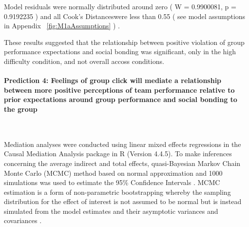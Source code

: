 \documentclass[english]{article}\usepackage[]{graphicx}\usepackage[]{color}
\makeatletter
\newenvironment{kframe}{%
 \def\at@end@of@kframe{}%
 \ifinner\ifhmode%
  \def\at@end@of@kframe{\end{minipage}}%
  \begin{minipage}{\columnwidth}%
 \fi\fi%
 \def\FrameCommand##1{\hskip\@totalleftmargin \hskip-\fboxsep
 \colorbox{shadecolor}{##1}\hskip-\fboxsep
     \hskip-\linewidth \hskip-\@totalleftmargin \hskip\columnwidth}%
 \MakeFramed {\advance\hsize-\width
   \@totalleftmargin\z@ \linewidth\hsize
   \@setminipage}}%
 {\par\unskip\endMakeFramed%
 \at@end@of@kframe}
\newenvironment{knitrout}{}{} %
\newcommand{\myparagraph}[1]{\paragraph{#1}\mbox{}\\}
\newcommand{\pvalue}{p =}
\newcommand{\resdist}{W = }
\newcommand{\cooksD}{Cook's Distances}
\makeatother
\begin{document}
Model residuals were normally distributed around zero
(
  \resdist
    0.9900081,
  \pvalue
    0.9192235
)
and all \cooksD were less than
  0.55
(
see model assumptions in Appendix  ~\ref{fig:M1aAssumptions}
)
.

These results suggested that the relationship between positive violation of group performance expectations and social bonding was significant, only in the high difficulty condition, and not overall accoss conditions.


\myparagraph{Prediction 4: Feelings of group click will mediate a relationship between more positive perceptions of team performance relative to prior expectations around group performance and social bonding to the group}

\begin{knitrout}
\color{fgcolor}\begin{kframe}


{\ttfamily\noindent\bfseries{}}

{\ttfamily\noindent\bfseries\color{errorcolor}{\#\# Error in summary(med.out.groupPerfExp): object 'med.out.groupPerfExp' not found}}

{\ttfamily\noindent\bfseries\color{errorcolor}{\#\# Error in summary(med.out.groupPerfExp): object 'med.out.groupPerfExp' not found}}

{\ttfamily\noindent\bfseries\color{errorcolor}{\#\# Error in summary(med.out.groupPerfExp.unclass): object 'med.out.groupPerfExp.unclass' not found}}\end{kframe}
\end{knitrout}

\begin{knitrout}
\color{fgcolor}\begin{kframe}


{\ttfamily\noindent\bfseries{}}\end{kframe}
\end{knitrout}

Mediation analyses were conducted using linear mixed effects regressions in the Causal Mediation Analysis package in R (Version 4.4.5).  To make inferences concerning the average indirect and total effects, quasi-Bayesian Markov Chain Monte Carlo (MCMC) method based on normal approximation and 1000 simulations was used to estimate the 95\% Confidence Intervals \citep{Tofighi2016a,Imai2010}. MCMC estimation is a form of non-parametric bootstrapping whereby the sampling distribution for the effect of interest is not assumed to be normal but is instead simulated from the model estimates and their asymptotic variances and covariances \cite{Preacher2008}.
\end{document}
